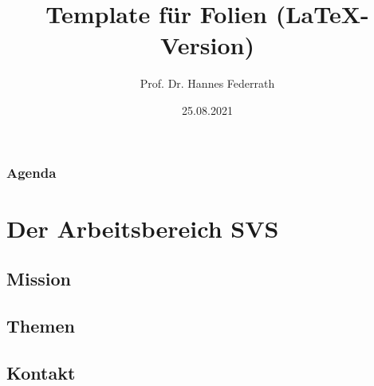 \documentclass[t,aspectratio=169]{beamer}
\title{Template für Folien (LaTeX-Version)}
\author[Federrath]{Prof. Dr. Hannes Federrath}
\date{25.08.2021}
\begin{document}
\begin{frame}
	\maketitle
\end{frame}

\begin{frame}
	\frametitle{Agenda}
	\tableofcontents
\end{frame}

\section{Der Arbeitsbereich SVS} %
\subsection{Mission} %
\subsection{Themen} %
\subsection{Kontakt} %
\end{document}

